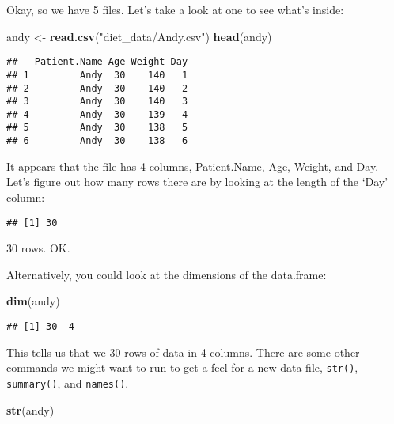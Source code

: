 \documentclass[
]{article}
\newenvironment{Shaded}{\begin{snugshade}}{\end{snugshade}}
\newcommand{\KeywordTok}[1]{\textcolor[rgb]{0.13,0.29,0.53}{\textbf{#1}}}
\newcommand{\NormalTok}[1]{#1}
\newcommand{\OperatorTok}[1]{\textcolor[rgb]{0.81,0.36,0.00}{\textbf{#1}}}
\newcommand{\StringTok}[1]{\textcolor[rgb]{0.31,0.60,0.02}{#1}}
\begin{document}
Okay, so we have 5 files. Let's take a look at one to see what's inside:

\begin{Shaded}
\begin{Highlighting}[]
\NormalTok{andy <-}\StringTok{ }\KeywordTok{read.csv}\NormalTok{(}\StringTok{"diet_data/Andy.csv"}\NormalTok{)}
\KeywordTok{head}\NormalTok{(andy)}
\end{Highlighting}
\end{Shaded}

\begin{verbatim}
##   Patient.Name Age Weight Day
## 1         Andy  30    140   1
## 2         Andy  30    140   2
## 3         Andy  30    140   3
## 4         Andy  30    139   4
## 5         Andy  30    138   5
## 6         Andy  30    138   6
\end{verbatim}

It appears that the file has 4 columns, Patient.Name, Age, Weight, and
Day. Let's figure out how many rows there are by looking at the length
of the `Day' column:

\begin{Shaded}
\end{Shaded}

\begin{verbatim}
## [1] 30
\end{verbatim}

30 rows. OK.

Alternatively, you could look at the dimensions of the data.frame:

\begin{Shaded}
\begin{Highlighting}[]
\KeywordTok{dim}\NormalTok{(andy)}
\end{Highlighting}
\end{Shaded}

\begin{verbatim}
## [1] 30  4
\end{verbatim}

This tells us that we 30 rows of data in 4 columns. There are some other
commands we might want to run to get a feel for a new data file,
\texttt{str()}, \texttt{summary()}, and \texttt{names()}.

\begin{Shaded}
\begin{Highlighting}[]
\KeywordTok{str}\NormalTok{(andy)}
\end{Highlighting}
\end{Shaded}
\end{document}
